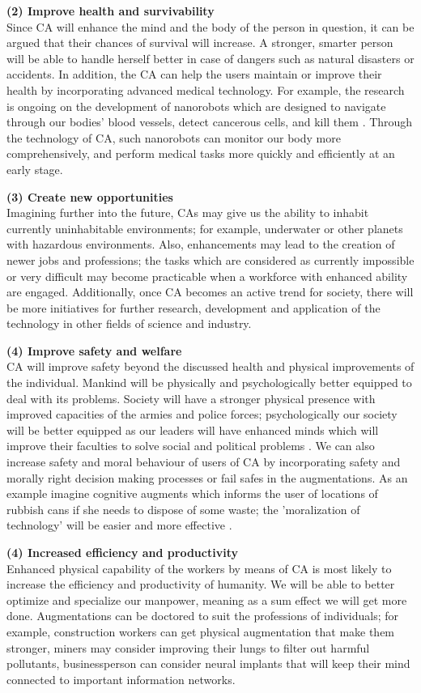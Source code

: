 {\bf (2) Improve health and survivability} \\
Since CA will enhance the mind and the body of the person in question, it can be argued that their chances of survival will increase. A stronger, smarter person will be able to handle herself better in case of dangers such as natural disasters or accidents. In addition, the CA can help the users maintain or improve their health by incorporating advanced medical technology. For example, the research is ongoing on the development of nanorobots which are designed to navigate through our bodies' blood vessels, detect cancerous cells, and kill them \cite{nanorobot}. Through the technology of CA, such nanorobots can monitor our body more comprehensively, and perform medical tasks more quickly and efficiently at an early stage. 

{\bf (3) Create new opportunities}\\
Imagining further into the future, CAs may give us the ability to inhabit currently uninhabitable environments; for example, underwater or other planets with hazardous environments. Also, enhancements may lead to the creation of newer jobs and professions; the tasks which are considered as currently impossible or very difficult may become practicable when a workforce with enhanced ability are engaged. Additionally, once CA becomes an active trend for society, there will be more initiatives for further research, development and application of the technology in other fields of science and industry.

{\bf (4) Improve safety and welfare}\\
CA will improve safety beyond the discussed health and physical improvements of the individual. Mankind will be physically and psychologically better equipped to deal with its problems. Society will have a stronger physical presence with improved capacities of the armies and police forces; psychologically our society will be better equipped as our leaders will have enhanced minds which will improve their faculties to solve social and political problems \cite{bostrom2013ethical}. We can also increase safety and moral behaviour of users of CA by incorporating safety and morally right decision making processes or fail safes in the augmentations. As an example imagine cognitive augments which informs the user of locations of rubbish cans if she needs to dispose of some waste; the 'moralization of technology' will be easier and more effective \cite{achterhuis1995moralisering}.

{\bf (4) Increased efficiency and productivity} \\
Enhanced physical capability of the workers by means of CA is most likely to increase the efficiency and productivity of humanity. We will be able to better optimize and specialize our manpower, meaning as a sum effect we will get more done. Augmentations can be doctored to suit the professions of individuals; for example, construction workers can get physical augmentation that make them stronger, miners may consider improving their lungs to filter out harmful pollutants, businessperson can consider neural implants that will keep their mind connected to important information networks.


